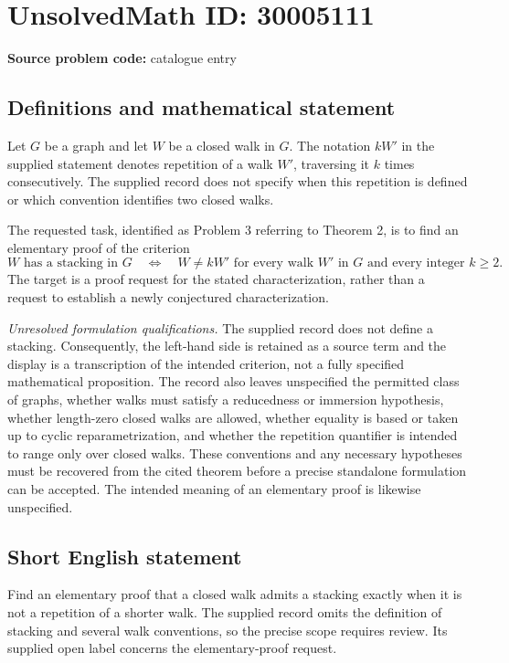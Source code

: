 \documentclass[11pt]{article}
\begin{document}
\section*{UnsolvedMath ID: 30005111}
\textbf{Source problem code:} catalogue entry
\subsection{Definitions and mathematical statement}
Let \(G\) be a graph and let \(W\) be a closed walk in \(G\). The notation \(kW'\) in the supplied statement denotes repetition of a walk \(W'\), traversing it \(k\) times consecutively. The supplied record does not specify when this repetition is defined or which convention identifies two closed walks.

The requested task, identified as Problem 3 referring to Theorem 2, is to find an elementary proof of the criterion
\[
W\text{ has a stacking in }G
\quad\Longleftrightarrow\quad
W\ne kW'\text{ for every walk }W'\text{ in }G\text{ and every integer }k\ge 2.
\]
The target is a proof request for the stated characterization, rather than a request to establish a newly conjectured characterization.

\emph{Unresolved formulation qualifications.} The supplied record does not define a stacking. Consequently, the left-hand side is retained as a source term and the display is a transcription of the intended criterion, not a fully specified mathematical proposition. The record also leaves unspecified the permitted class of graphs, whether walks must satisfy a reducedness or immersion hypothesis, whether length-zero closed walks are allowed, whether equality is based or taken up to cyclic reparametrization, and whether the repetition quantifier is intended to range only over closed walks. These conventions and any necessary hypotheses must be recovered from the cited theorem before a precise standalone formulation can be accepted. The intended meaning of an elementary proof is likewise unspecified.
\subsection{Short English statement}
Find an elementary proof that a closed walk admits a stacking exactly when it is not a repetition of a shorter walk. The supplied record omits the definition of stacking and several walk conventions, so the precise scope requires review. Its supplied open label concerns the elementary-proof request.
\end{document}
